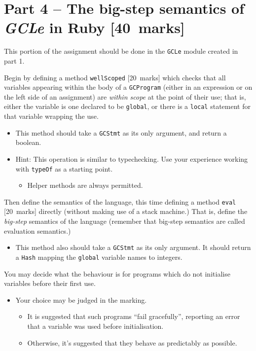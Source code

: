 \documentclass[11pt]{article}
\theoremstyle{definition}
\begin{document}
\section*{Part 4 – The big-step semantics of \emph{GCLe} in Ruby       [40 marks]}
\label{sec:org82c7def}
This portion of the assignment should be done in
the \texttt{GCLe} module created in part 1.

Begin by defining a method \texttt{wellScoped} [20 marks] which checks that
all variables appearing within the body of a \texttt{GCProgram}
(either in an expression or on the left side of an assignment)
are \emph{within scope} at the point of their use;
that is, either the variable is one declared to be \texttt{global},
or there is a \texttt{local} statement for that variable wrapping the use.
\begin{itemize}
\item This method should take a \texttt{GCStmt} as its only argument,
and return a boolean.
\item Hint: This operation is similar to typechecking.
Use your experience working with \texttt{typeOf} as a starting point.
\begin{itemize}
\item Helper methods are always permitted.
\end{itemize}
\end{itemize}

Then define the semantics of the language,
this time defining a method \texttt{eval} [20 marks] directly
(without making use of a stack machine.)
That is, define the \emph{big-step} semantics of the language
(remember that big-step semantics are called evaluation semantics.)
\begin{itemize}
\item This method also should take a \texttt{GCStmt} as its only argument.
It should return a \texttt{Hash} mapping the \texttt{global} variable names
to integers.
\end{itemize}

You may decide what the behaviour is for programs which
do not initialise variables before their first use.
\begin{itemize}
\item Your choice may be judged in the marking.
\begin{itemize}
\item It is suggested that such programs “fail gracefully”,
reporting an error that a variable was used before initialisation.
\item Otherwise, it's suggested that they behave as predictably as possible.
\end{itemize}
\end{itemize}
\end{document}
